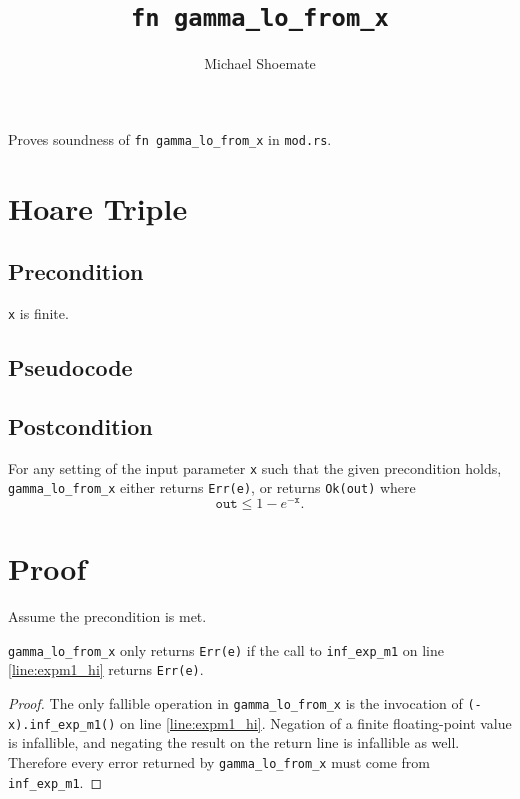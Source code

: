 \documentclass{article}
\title{\texttt{fn gamma\_lo\_from\_x}}
\author{Michael Shoemate}
\begin{document}
\maketitle

Proves soundness of \texttt{fn gamma\_lo\_from\_x} in \texttt{mod.rs}.

\section{Hoare Triple}
\subsection*{Precondition}
\texttt{x} is finite.

\subsection*{Pseudocode}


\subsection*{Postcondition}
\begin{theorem}
\label{postcondition}
For any setting of the input parameter \texttt{x} such that the given precondition holds,
\texttt{gamma\_lo\_from\_x} either returns \texttt{Err(e)},
or returns \texttt{Ok(out)} where
\[
\texttt{out} \le 1 - e^{-\texttt{x}}.
\]
\end{theorem}

\section{Proof}

Assume the precondition is met.

\begin{lemma}
\label{err-e}
\texttt{gamma\_lo\_from\_x} only returns \texttt{Err(e)} if the call to
\texttt{inf\_exp\_m1} on line \ref{line:expm1_hi} returns \texttt{Err(e)}.
\end{lemma}

\begin{proof}
The only fallible operation in \texttt{gamma\_lo\_from\_x} is the invocation of
\texttt{(-x).inf\_exp\_m1()} on line \ref{line:expm1_hi}.
Negation of a finite floating-point value is infallible, and negating the result on the return line
is infallible as well.
Therefore every error returned by \texttt{gamma\_lo\_from\_x} must come from
\texttt{inf\_exp\_m1}.
\end{proof}
\end{document}
